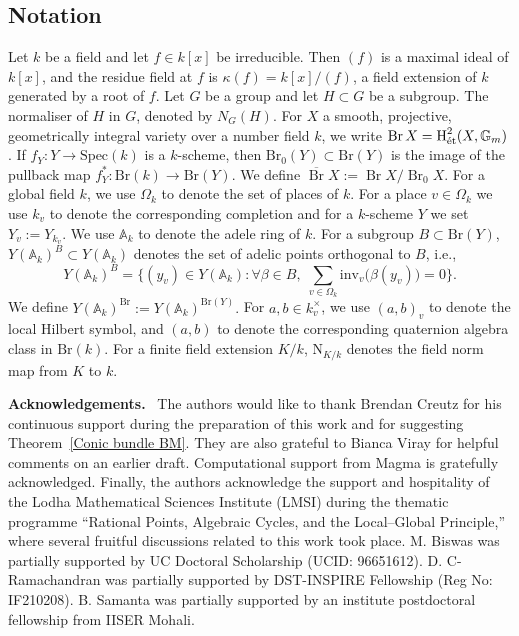 \documentclass[10pt]{amsart}
\theoremstyle{plain}
\theoremstyle{definition}
\newenvironment{acknowledgements}
{\par\noindent\textbf{Acknowledgements.}\ }
{\par}
\newcommand{\Nm}{\mathrm{N}}
\newcommand{\Br}{\operatorname{Br}}
\begin{document}
 \subsection{Notation} Let $k$ be a field and let $f \in k[x]$ be irreducible. Then $(f)$ is a maximal ideal of $k[x]$, and the residue field at $f$ is
$\kappa(f) = k[x]/(f)$,
a field extension of $k$ generated by a root of $f$.
Let $G$ be a group and let $H \subset G$ be a subgroup. The normaliser of $H$ in $G$, denoted by $N_G(H)$.
    For $X$ a smooth, projective, geometrically integral variety over a number field $k$, we write $\Br X=\operatorname{H}^2_{\text{\rm \'et}}(X,\mathbb{G}_m)$. If $f_Y : Y \to \mathrm{Spec}(k)$ is a $k$-scheme, then $\mathrm{Br}_0(Y) \subset \mathrm{Br}(Y)$ is the image of the pullback map $f_Y^* : \mathrm{Br}(k) \to \mathrm{Br}(Y)$. We define $\overline{\Br}X:=\Br X/\Br_0X$.
    For a global field $k$, we use $\Omega_k$ to denote the set of places of $k$. For a place $v \in \Omega_k$ we use $k_v$ to denote the corresponding completion and for a $k$-scheme $Y$ we set $Y_v := Y_{k_v}$. We use $\mathbb{A}_k$ to denote the adele ring of $k$. For a subgroup $B \subset \mathrm{Br}(Y)$, $Y(\mathbb{A}_k)^B \subset Y(\mathbb{A}_k)$ denotes the set of adelic points orthogonal to $B$, i.e.,
\[
Y(\mathbb{A}_k)^B
=
\{(y_v) \in Y(\mathbb{A}_k) :
\forall \beta \in B,\;
\sum_{v \in \Omega_k} \mathrm{inv}_v\bigl(\beta(y_v)\bigr) = 0\}.
\]
We define $Y(\mathbb{A}_k)^{\mathrm{Br}} := Y(\mathbb{A}_k)^{\mathrm{Br}(Y)}.$ For $a,b \in k_v^\times$, we use $(a,b)_v$ to denote the local Hilbert symbol, and $(a,b)$ to denote the corresponding quaternion algebra class in $\mathrm{Br}(k)$. For a finite field extension $K/k$, $\Nm_{K/k}$ denotes the field norm map from $K$ to $k$.

\smallskip

\begin{acknowledgements}
The authors would like to thank Brendan Creutz for his continuous support during the preparation of this work and for suggesting Theorem~\ref{Conic bundle BM}. They are also grateful to Bianca Viray for helpful comments on an earlier draft. Computational support from Magma is gratefully acknowledged. Finally, the authors acknowledge the support and hospitality of the Lodha Mathematical Sciences Institute (LMSI) during the thematic programme ``Rational Points, Algebraic Cycles, and the Local--Global Principle,'' where several fruitful discussions related to this work took place. M. Biswas was partially supported by UC Doctoral Scholarship (UCID: 96651612). D. C-Ramachandran was partially supported by DST-INSPIRE Fellowship (Reg No: IF210208). B. Samanta was partially supported by an institute postdoctoral fellowship from IISER Mohali.
\end{acknowledgements}
\end{document}
